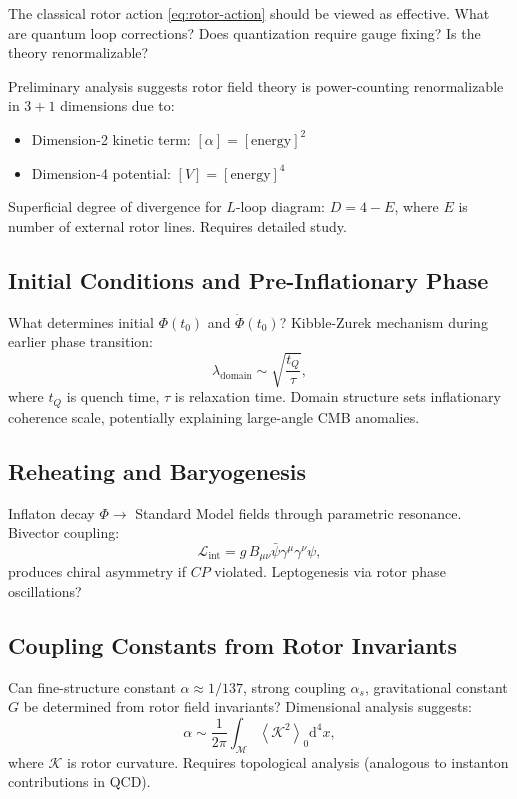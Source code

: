 \documentclass[11pt,a4paper]{article}
\numberwithin{equation}{section}
\theoremstyle{plain}
\theoremstyle{definition}
\theoremstyle{remark}
\newcommand{\grade}[2]{\left\langle #1 \right\rangle_{#2}}
\newcommand{\scal}[1]{\grade{#1}{0}}       %
\newcommand{\dd}{\mathrm{d}}
\begin{document}
The classical rotor action \eqref{eq:rotor-action} should be viewed as effective. What are quantum loop corrections? Does quantization require gauge fixing? Is the theory renormalizable?

Preliminary analysis suggests rotor field theory is power-counting renormalizable in $3+1$ dimensions due to:
\begin{itemize}
\item Dimension-2 kinetic term: $[\alpha] = [\mathrm{energy}]^2$
\item Dimension-4 potential: $[V] = [\mathrm{energy}]^4$
\end{itemize}

Superficial degree of divergence for $L$-loop diagram: $D = 4 - E$, where $E$ is number of external rotor lines. Requires detailed study.

\subsection{Initial Conditions and Pre-Inflationary Phase}

What determines initial $\Phi(t_0)$ and $\dot{\Phi}(t_0)$? Kibble-Zurek mechanism during earlier phase transition:
\begin{equation}
\lambda_{\mathrm{domain}} \sim \sqrt{\frac{t_Q}{\tau}},
\end{equation}
where $t_Q$ is quench time, $\tau$ is relaxation time. Domain structure sets inflationary coherence scale, potentially explaining large-angle CMB anomalies.

\subsection{Reheating and Baryogenesis}

Inflaton decay $\Phi \to$ Standard Model fields through parametric resonance. Bivector coupling:
\begin{equation}
\mathcal{L}_{\mathrm{int}} = g\,B_{\mu\nu}\bar{\psi}\gamma^\mu\gamma^\nu\psi,
\end{equation}
produces chiral asymmetry if $CP$ violated. Leptogenesis via rotor phase oscillations?

\subsection{Coupling Constants from Rotor Invariants}

Can fine-structure constant $\alpha \approx 1/137$, strong coupling $\alpha_s$, gravitational constant $G$ be determined from rotor field invariants? Dimensional analysis suggests:
\begin{equation}
\alpha \sim \frac{1}{2\pi}\int_{\mathcal{M}} \scal{\mathcal{K}^2}\dd^4x,
\end{equation}
where $\mathcal{K}$ is rotor curvature. Requires topological analysis (analogous to instanton contributions in QCD).
\end{document}
